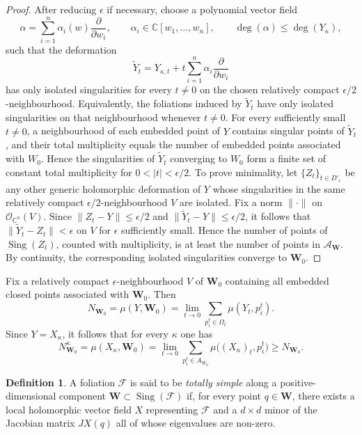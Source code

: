 \documentclass[10pt,twoside]{amsart}
\numberwithin{equation}{section}
\theoremstyle{definition}
\newtheorem{definition}[proposition]{Definition}
\theoremstyle{remark}
\DeclareMathOperator{\sing}{Sing}
\newcommand{\C}{\mathbb{C}}
\newcommand{\fol}{\mathcal{F}}
\newcommand{\oo}{\mathcal{O}}
\newcommand{\W}{\mathbf{W}}
\begin{document}
\begin{proof}
After reducing $\epsilon$ if necessary, choose a polynomial vector field
\[
\alpha=\sum_{i=1}^n \alpha_i(w)\frac{\partial}{\partial w_i},
\qquad
\alpha_i\in \C[w_1,\ldots,w_n],
\qquad
\deg(\alpha)\leq \deg(Y_\kappa),
\]
such that the deformation
\begin{equation}\label{eq:principal-deformation}
\widetilde{Y}_t
=
Y_{\kappa,t}+t\sum_{i=1}^n \alpha_i \frac{\partial}{\partial w_i}
\end{equation}
has only isolated singularities for every $t\ne 0$ on the chosen relatively compact $\epsilon/2$-neighbourhood.
Equivalently, the foliations induced by $\widetilde{Y}_t$ have only isolated singularities on that neighbourhood whenever $t\ne 0$.
For every sufficiently small $t\neq0$, a neighbourhood of each embedded point of $Y$ contains singular points of $\widetilde Y_t$, and their total multiplicity equals the number of embedded points associated with $W_0$. Hence the singularities of $\widetilde Y_t$ converging to $W_0$ form a finite set of constant total multiplicity for $0<|t|<\epsilon/2$.
To prove minimality, let $\{Z_t\}_{t\in D'_\epsilon}$ be any other generic holomorphic deformation of $Y$ whose singularities in the same relatively compact $\epsilon/2$-neighbourhood $V$ are isolated.
Fix a norm $\|\cdot\|$ on $\oo_{\C^n}(V)$.
Since $\|Z_t-Y\|\leq \epsilon/2$ and $\|\widetilde{Y}_t-Y\|\leq \epsilon/2$, it follows that
$\|\widetilde{Y}_t-Z_t\|<\epsilon$ on $V$ for $\epsilon$ sufficiently small.
Hence the number of points of $\sing(Z_t)$, counted with multiplicity, is at least the number of points in $\mathcal A_{\W}$. By continuity, the corresponding isolated singularities converge to $\W_0$.
\end{proof}


Fix a relatively compact $\epsilon$-neighbourhood $V$ of $\W_0$ containing all embedded closed points associated with $\W_0$.
Then
\begin{equation}\label{eq:NW0-muY}
N_{\W_0}
=\mu(Y,\W_0)
=\lim_{t\to0}\sum_{p_i^t\in \Omega_t}\mu(Y_t,p_i^t).
\end{equation}
Since $Y=X_\kappa$, it follows that for every $\kappa$ one has
\begin{equation}\label{eq:Nkappa-mu}
N^\kappa_{\W_0}
=\mu(X_\kappa,\W_0)
=\lim_{t\to 0}\sum_{p_i^t\in A_{W_0}} \mu\bigl((X_\kappa)_t,p_i^t\bigr)
\geq N_{\W_0}.
\end{equation}

\begin{definition}\label{def:totally-simple}
A foliation $\fol$ is said to be \emph{totally simple} along a positive-dimensional component
$\W\subset \sing(\fol)$ if, for every point $q\in\W$, there exists a local holomorphic vector field $X$ representing $\fol$ and a $d\times d$ minor of the Jacobian matrix $JX(q)$ all of whose eigenvalues are non-zero.
\end{definition}
\end{document}
